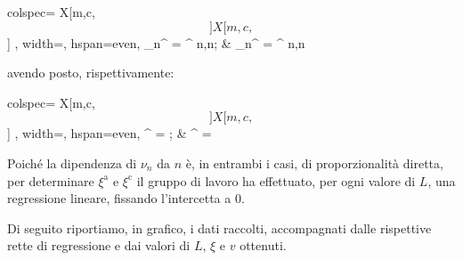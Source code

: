 \documentclass{article}
\newcommand*{\diam}{\varnothing}
\begin{document}
\begin{center}\begin{tblr}{
  colspec={ X[m,c,$$]X[m,c,$$] },
  width=\textwidth,
  hspan=even,
}
  \nu_n^ = \xi^ n,\quad n\in{};
  &
  \nu_n^ = \xi^ n,\quad n\in{}\;
\end{tblr}\end{center}
avendo posto, rispettivamente:

\begin{center}\begin{tblr}{
  colspec={ X[m,c,$$]X[m,c,$$] },
  width=\textwidth,
  hspan=even,
}
  \xi^ = \frac{v}{2L + 1.6 \diam};
  &
  \xi^ = \frac{v}{4L + 1.6 \diam}
\end{tblr}\end{center}

Poiché la dipendenza di $\nu_n$ da $n$ è, in entrambi i casi,
di proporzionalità diretta, per determinare $\xi^\text{a}$
e $\xi^\text{c}$ il gruppo di lavoro ha effettuato, per ogni
valore di $L$, una regressione lineare, fissando l'intercetta a 0.

Di seguito riportiamo, in grafico, i dati raccolti, accompagnati
dalle rispettive rette di regressione e dai valori di $L$,
$\xi$ e $v$ ottenuti.
\end{document}
